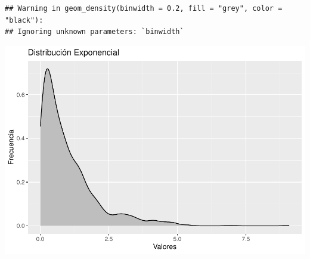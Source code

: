 \documentclass[
]{article}
\begin{document}
\begin{verbatim}
## Warning in geom_density(binwidth = 0.2, fill = "grey", color = "black"):
## Ignoring unknown parameters: `binwidth`
\end{verbatim}

\includegraphics{clase02_files/figure-latex/unnamed-chunk-1-3.pdf}

\begin{verbatim}
\end{verbatim}
\end{document}
